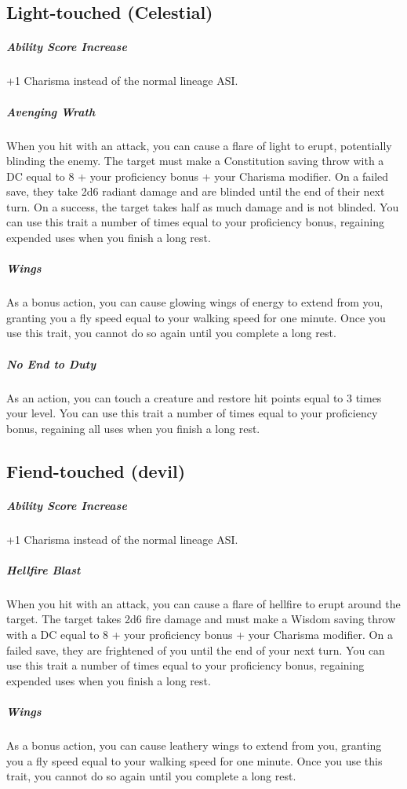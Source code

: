 \subsection{Light-touched (Celestial)}

\subparagraph*{Ability Score Increase}  +1 Charisma instead of the normal lineage ASI.

\subparagraph*{Avenging Wrath}  When you hit with an attack, you can cause a flare of light to erupt, potentially blinding the enemy. The target must make a Constitution saving throw with a DC equal to 8 + your proficiency bonus + your Charisma modifier. On a failed save, they take 2d6 radiant damage and are blinded until the end of their next turn. On a success, the target takes half as much damage and is not blinded. You can use this trait a number of times equal to your proficiency bonus, regaining expended uses when you finish a long rest.

\subparagraph*{Wings}  As a bonus action, you can cause glowing wings of energy to extend from you, granting you a fly speed equal to your walking speed for one minute. Once you use this trait, you cannot do so again until you complete a long rest.

\subparagraph*{No End to Duty}  As an action, you can touch a creature and restore hit points equal to 3 times your level. You can use this trait a number of times equal to your proficiency bonus, regaining all uses when you finish a long rest.

\subsection{Fiend-touched (devil)}

\subparagraph*{Ability Score Increase}  +1 Charisma instead of the normal lineage ASI.

\subparagraph*{Hellfire Blast}  When you hit with an attack, you can cause a flare of hellfire to erupt around the target. The target takes 2d6 fire damage and must make a Wisdom saving throw with a DC equal to 8 + your proficiency bonus + your Charisma modifier. On a failed save, they are frightened of you until the end of your next turn. You can use this trait a number of times equal to your proficiency bonus, regaining expended uses when you finish a long rest.

\subparagraph*{Wings}  As a bonus action, you can cause leathery wings to extend from you, granting you a fly speed equal to your walking speed for one minute. Once you use this trait, you cannot do so again until you complete a long rest.

